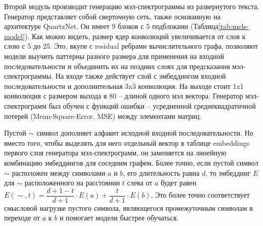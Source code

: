 Второй модуль производит генерацию мэл-спектрограммы из развернутого текста. Генератор представляет собой сверточную сеть, также основанную на архитектуре QuartzNet. Он имеет 9 блоков с 5 подблоками (Таблица\ref{tab:mels-model}). Как можно видеть, размер ядер конволюций увеличивается от слоя к слою с 5 до 25. Это, вкупе с residual ребрами вычислительного графа, позволяют модели выучить паттерны разного размера для применения на входной последовательности и объединить их на поздних слоях для предсказания мэл-спектрограммы. На входе также действует слой с эмбеддингом входной последовательности и дополнительная 3x3 конволюция. На выходе стоит 1x1 конволюция с размером выхода в 80 -- длиной одного мэл вектора. Генератор мэл-спектрограмм был обучен с функций ошибки -- усредненной среднеквадратичной потерей (Mean-Square-Error, MSE) между элементами матриц.

Пустой $\sim$ символ дополняет алфавит исходной входной последовательности. Но вместо того, чтобы выделять для него отдельный вектор в таблице embeddings первого слоя генератора мэл-спектрограмм, он заменяется на линейную комбинацию эмбеддингов для соседним графем. Более точно, если пустой символ $\sim$ расположен между символами $a$ и $b$, его длительность равна $d$, то эмбеддинг $E$ для $\sim$ расположенного на расстоянии $t$ слева от $a$ будет равен $E (\sim, t) = \dfrac{d+1-t}{d+1} \cdot E(a) + \dfrac{t}{d+1} \cdot E (b)$. Это более точно соответствует смысловой нагрузке пустого символа, являющегося промежуточным символам в переходе от $a$ к $b$ и помогает модели быстрее обучаться.

\begin{table}[!ht]
\centering
{}
\caption{Параметры генератора мэл-спектрограмм с архитектурой, основанной на QuartzNet 9x5}
\label{tab:mels-model}
\end{table}

